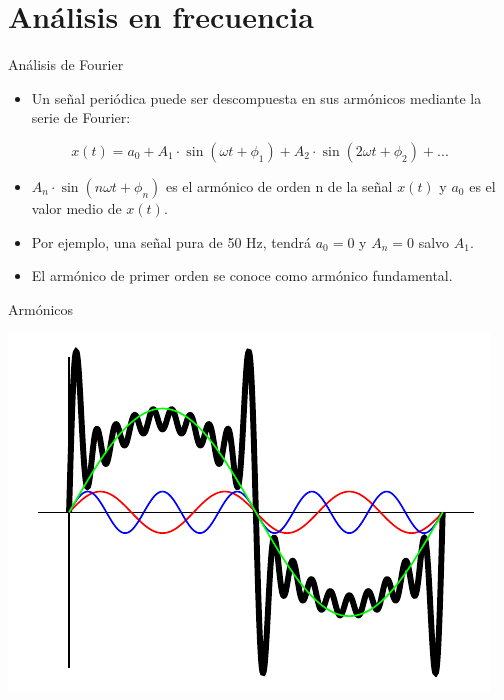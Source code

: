 \documentclass[xcolor={usenames,svgnames,dvipsnames}]{beamer}
\begin{document}
\section{Análisis en frecuencia}
\label{sec:orge54cdac}
\begin{frame}[label={sec:orgaae7030}]{Análisis de Fourier}
\begin{itemize}
\item Un señal periódica puede ser descompuesta en sus armónicos mediante la serie de Fourier:
\end{itemize}
$$x(t)=a_{0}+A_{1}\cdot\sin(\omega t+\phi_{1})+A_{2}\cdot\sin(2\omega
  t+\phi_{2})+...$$

\begin{itemize}
\item \(A_{n}\cdot\sin(n\omega t+\phi_{n})\) es el armónico de orden n de la señal \(x(t)\) y \(a_{0}\) es el valor medio de \(x(t)\).

\item Por ejemplo, una señal pura de 50 Hz, tendrá \(a_{0}=0\) y \(A_{n}=0\) salvo \(A_{1}\).

\item El armónico de primer orden se conoce como armónico fundamental.
\end{itemize}
\end{frame}

\begin{frame}[label={sec:org9edd8cf}]{Armónicos}
\begin{center}
\includegraphics[width=.9\linewidth]{../figs/Armonicos.pdf}
\end{center}
\end{frame}
\end{document}
